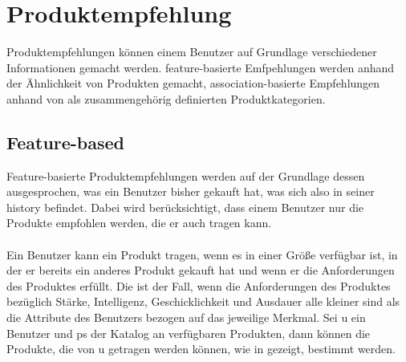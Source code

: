 \chapter{Produktempfehlung}
Produktempfehlungen können einem Benutzer auf Grundlage verschiedener Informationen gemacht werden. feature-basierte Emfpehlungen werden anhand der Ähnlichkeit von Produkten gemacht, association-basierte Empfehlungen anhand von als zusammengehörig definierten Produktkategorien.

\section{Feature-based}
Feature-basierte Produktempfehlungen werden auf der Grundlage dessen aus\-ge\-spro\-chen, was ein Benutzer bisher gekauft hat, was sich also in seiner \textsf{history}  befindet. Dabei wird berücksichtigt, dass einem Benutzer nur die Produkte empfohlen werden, die er auch tragen kann. \\
\\
Ein Benutzer kann ein Produkt tragen, wenn es in einer Größe verfügbar ist, in der er bereits ein anderes Produkt gekauft hat und wenn er die Anforderungen des Produktes erfüllt. Die ist der Fall, wenn die Anforderungen des Produktes bezüglich Stärke, Intelligenz, Geschicklichkeit und Ausdauer alle kleiner sind als die Attribute des Benutzers bezogen auf das jeweilige Merkmal. Sei \textsf{u} ein Benutzer und \textsf{ps} der Katalog an verfügbaren Produkten, dann können die Produkte, die von \textsf{u} getragen werden können, wie in  gezeigt, bestimmt werden.

